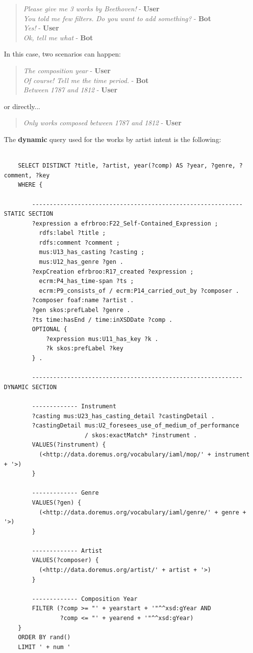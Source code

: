\documentclass[a4paper,12pt]{report}
\begin{document}
	\begin{verse}
	\textit{Please give me 3 works by Beethoven!} - \textbf{User}\\
	\textit{You told me few filters. Do you want to add something?} - \textbf{Bot}\\
	\textit{Yes!} - \textbf{User}\\
	\textit{Ok, tell me what} - \textbf{Bot}\\
	\end{verse}
	In this case, two scenarios can happen:
	\begin{verse}
	\textit{The composition year} - \textbf{User}\\
	\textit{Of course! Tell me the time period.} - \textbf{Bot}\\
	\textit{Between 1787 and 1812} - \textbf{User}\\
	\end{verse}
	or directly...
	\begin{verse}
	\textit{Only works composed between 1787 and 1812} - \textbf{User}\\
	\end{verse}
	The \textbf{dynamic} query used for the works by artist intent is the following:
	\begin{lstlisting}
	
	SELECT DISTINCT ?title, ?artist, year(?comp) AS ?year, ?genre, ?comment, ?key
	WHERE {
	
		------------------------------------------------------------ STATIC SECTION
		?expression a efrbroo:F22_Self-Contained_Expression ;
		  rdfs:label ?title ;
		  rdfs:comment ?comment ;
		  mus:U13_has_casting ?casting ;
		  mus:U12_has_genre ?gen .
		?expCreation efrbroo:R17_created ?expression ;
		  ecrm:P4_has_time-span ?ts ;
		  ecrm:P9_consists_of / ecrm:P14_carried_out_by ?composer .
		?composer foaf:name ?artist .
		?gen skos:prefLabel ?genre .
		?ts time:hasEnd / time:inXSDDate ?comp .
		OPTIONAL {
			?expression mus:U11_has_key ?k .
			?k skos:prefLabel ?key
		} .
		
		------------------------------------------------------------ DYNAMIC SECTION
		
		------------- Instrument
		?casting mus:U23_has_casting_detail ?castingDetail .
		?castingDetail mus:U2_foresees_use_of_medium_of_performance
		               / skos:exactMatch* ?instrument .
		VALUES(?instrument) {
		  (<http://data.doremus.org/vocabulary/iaml/mop/' + instrument + '>)
		}
		
		------------- Genre
		VALUES(?gen) {
		  (<http://data.doremus.org/vocabulary/iaml/genre/' + genre + '>)
		}
		
		------------- Artist
		VALUES(?composer) {
		  (<http://data.doremus.org/artist/' + artist + '>)
		}
		
		------------- Composition Year
		FILTER (?comp >= "' + yearstart + '"^^xsd:gYear AND
		        ?comp <= "' + yearend + '"^^xsd:gYear)
	}
	ORDER BY rand()
	LIMIT ' + num '
	\end{lstlisting}
\end{document}
